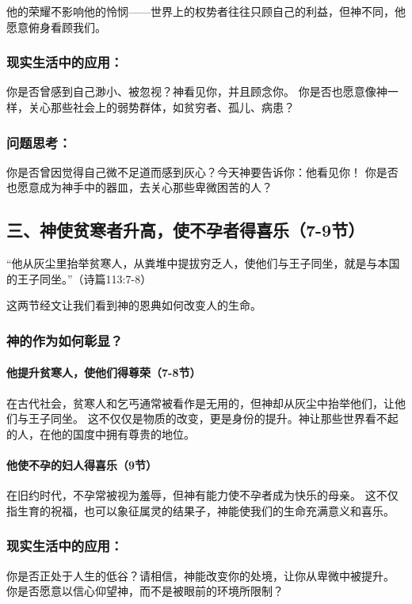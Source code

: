 \documentclass[a4paper, 12pt]{article}
\begin{document}
他的荣耀不影响他的怜悯——世界上的权势者往往只顾自己的利益，但神不同，他愿意俯身看顾我们。

\subsubsection*{现实生活中的应用：}

你是否曾感到自己渺小、被忽视？神看见你，并且顾念你。
你是否也愿意像神一样，关心那些社会上的弱势群体，如贫穷者、孤儿、病患？
\subsubsection*{问题思考：}

你是否曾因觉得自己微不足道而感到灰心？今天神要告诉你：他看见你！
你是否也愿意成为神手中的器皿，去关心那些卑微困苦的人？
\subsection*{三、神使贫寒者升高，使不孕者得喜乐（7-9节）}
“他从灰尘里抬举贫寒人，从粪堆中提拔穷乏人，使他们与王子同坐，就是与本国的王子同坐。”（诗篇113:7-8）

这两节经文让我们看到神的恩典如何改变人的生命。

\subsubsection*{神的作为如何彰显？}

\paragraph*{他提升贫寒人，使他们得尊荣（7-8节）}
在古代社会，贫寒人和乞丐通常被看作是无用的，但神却从灰尘中抬举他们，让他们与王子同坐。
这不仅仅是物质的改变，更是身份的提升。神让那些世界看不起的人，在他的国度中拥有尊贵的地位。
\paragraph*{他使不孕的妇人得喜乐（9节）}
在旧约时代，不孕常被视为羞辱，但神有能力使不孕者成为快乐的母亲。
这不仅指生育的祝福，也可以象征属灵的结果子，神能使我们的生命充满意义和喜乐。
\subsubsection*{现实生活中的应用：}

你是否正处于人生的低谷？请相信，神能改变你的处境，让你从卑微中被提升。
你是否愿意以信心仰望神，而不是被眼前的环境所限制？
\end{document}
